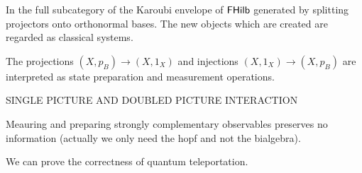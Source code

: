 \begin{remark}
In the full subcategory of the Karoubi envelope of $\mathsf{FHilb}$ generated by splitting projectors onto orthonormal bases.  
The new objects which are created are regarded as classical systems.

 The projections $(X,p_B)\to (X,1_X)$ and injections $(X,1_X)\to (X,p_B)$ are interpreted as state preparation and measurement operations.
\end{remark}

SINGLE PICTURE AND DOUBLED PICTURE INTERACTION

\begin{lemma}
Meauring and preparing strongly complementary observables preserves no information (actually we only need the hopf and not the bialgebra).
\end{lemma}

We can prove the correctness of quantum teleportation.

\begin{example}

\end{example}


